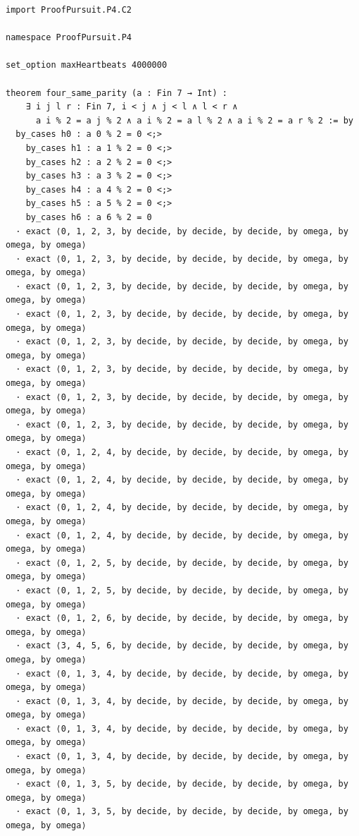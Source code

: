 \documentclass[11pt,a4paper]{article}
\begin{document}
\begin{Verbatim}[breaklines,breakanywhere,fontsize=\footnotesize]
import ProofPursuit.P4.C2

namespace ProofPursuit.P4

set_option maxHeartbeats 4000000

theorem four_same_parity (a : Fin 7 → Int) :
    ∃ i j l r : Fin 7, i < j ∧ j < l ∧ l < r ∧
      a i % 2 = a j % 2 ∧ a i % 2 = a l % 2 ∧ a i % 2 = a r % 2 := by
  by_cases h0 : a 0 % 2 = 0 <;>
    by_cases h1 : a 1 % 2 = 0 <;>
    by_cases h2 : a 2 % 2 = 0 <;>
    by_cases h3 : a 3 % 2 = 0 <;>
    by_cases h4 : a 4 % 2 = 0 <;>
    by_cases h5 : a 5 % 2 = 0 <;>
    by_cases h6 : a 6 % 2 = 0
  · exact ⟨0, 1, 2, 3, by decide, by decide, by decide, by omega, by omega, by omega⟩
  · exact ⟨0, 1, 2, 3, by decide, by decide, by decide, by omega, by omega, by omega⟩
  · exact ⟨0, 1, 2, 3, by decide, by decide, by decide, by omega, by omega, by omega⟩
  · exact ⟨0, 1, 2, 3, by decide, by decide, by decide, by omega, by omega, by omega⟩
  · exact ⟨0, 1, 2, 3, by decide, by decide, by decide, by omega, by omega, by omega⟩
  · exact ⟨0, 1, 2, 3, by decide, by decide, by decide, by omega, by omega, by omega⟩
  · exact ⟨0, 1, 2, 3, by decide, by decide, by decide, by omega, by omega, by omega⟩
  · exact ⟨0, 1, 2, 3, by decide, by decide, by decide, by omega, by omega, by omega⟩
  · exact ⟨0, 1, 2, 4, by decide, by decide, by decide, by omega, by omega, by omega⟩
  · exact ⟨0, 1, 2, 4, by decide, by decide, by decide, by omega, by omega, by omega⟩
  · exact ⟨0, 1, 2, 4, by decide, by decide, by decide, by omega, by omega, by omega⟩
  · exact ⟨0, 1, 2, 4, by decide, by decide, by decide, by omega, by omega, by omega⟩
  · exact ⟨0, 1, 2, 5, by decide, by decide, by decide, by omega, by omega, by omega⟩
  · exact ⟨0, 1, 2, 5, by decide, by decide, by decide, by omega, by omega, by omega⟩
  · exact ⟨0, 1, 2, 6, by decide, by decide, by decide, by omega, by omega, by omega⟩
  · exact ⟨3, 4, 5, 6, by decide, by decide, by decide, by omega, by omega, by omega⟩
  · exact ⟨0, 1, 3, 4, by decide, by decide, by decide, by omega, by omega, by omega⟩
  · exact ⟨0, 1, 3, 4, by decide, by decide, by decide, by omega, by omega, by omega⟩
  · exact ⟨0, 1, 3, 4, by decide, by decide, by decide, by omega, by omega, by omega⟩
  · exact ⟨0, 1, 3, 4, by decide, by decide, by decide, by omega, by omega, by omega⟩
  · exact ⟨0, 1, 3, 5, by decide, by decide, by decide, by omega, by omega, by omega⟩
  · exact ⟨0, 1, 3, 5, by decide, by decide, by decide, by omega, by omega, by omega⟩

\end{Verbatim}
\end{document}
